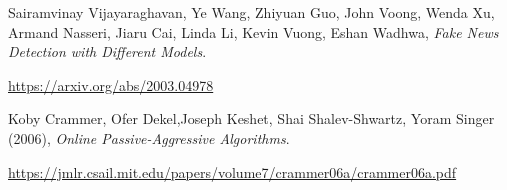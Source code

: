 \documentclass[12pt,a4paper,oneside]{book}
\begin{document}
\newpage
\renewcommand{\bibname}{\bf \LARGE \quad DANH MỤC TÀI LIỆU THAM KHẢO}
\baselineskip
18pt
\begin{thebibliography}{99}
	
	\bibitem{} Sairamvinay Vijayaraghavan, Ye Wang, Zhiyuan Guo, John Voong, Wenda Xu, Armand Nasseri, Jiaru Cai, Linda Li, Kevin Vuong, Eshan Wadhwa,
	\textit{Fake News Detection with Different Models}.
	
	\url{https://arxiv.org/abs/2003.04978}
	
	\bibitem{} Koby Crammer, Ofer Dekel,Joseph Keshet, Shai Shalev-Shwartz, Yoram Singer (2006), \textit{Online Passive-Aggressive Algorithms}.
	
	\url{https://jmlr.csail.mit.edu/papers/volume7/crammer06a/crammer06a.pdf}
	
\end{thebibliography}
\end{document}
